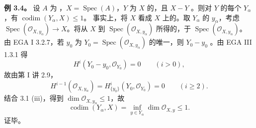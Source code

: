 \textbf{例 3.4。} 设 $A$ 为 ，$X=\operatorname{Spec}(A)$，$Y$ 为 $X$ 的，且 $X-Y$ 。则对 $Y$ 的每个 $Y_{\alpha}$，有 $\operatorname{codim}(Y_{\alpha},X)\le1$。
事实上，将 $X$ 看成 $X$ 上的。取 $Y_{\alpha}$ 的 $y_{\alpha}$，考虑 $\operatorname{Spec}(\mathcal O_{X,y_{\alpha}})\to X$。将从 $X$ 到 $\operatorname{Spec}(\mathcal O_{X,y_{\alpha}})$ 所得的，于 $\operatorname{Spec}(\mathcal O_{X,y_{\alpha}})$。
由 EGA I 3.2.7，若 $y_0$ 为 $Y_0=\operatorname{Spec}(\mathcal O_{X,y_{\alpha}})$ 的唯一，则 $Y_0-y_0$ 。由 EGA III 1.3.1 得
\[H^i(Y_0-y_0,\mathcal O_{Y_0})=0\qquad(i>0),\]
故由第 I 讲 2.9，
\[H^{i-1}(\mathcal O_{X,y_{\alpha}})=H^i_{\{y_0\}}(Y_0,\mathcal O_{Y_0})=0\qquad(i\ge2).\]
结合 3.1 (iii)，得到 $\dim\mathcal O_{X,y_{\alpha}}\le1$，故
\[\operatorname{codim}(Y_{\alpha},X)=\inf_{y\in Y_{\alpha}}\dim\mathcal O_{X,y}\le1.\]
证毕。

